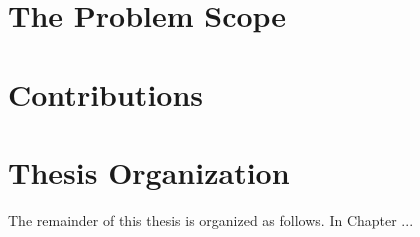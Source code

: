 \section{The Problem Scope}

\section{Contributions}

\section{Thesis Organization}

The remainder of this thesis is organized as follows. In Chapter ...